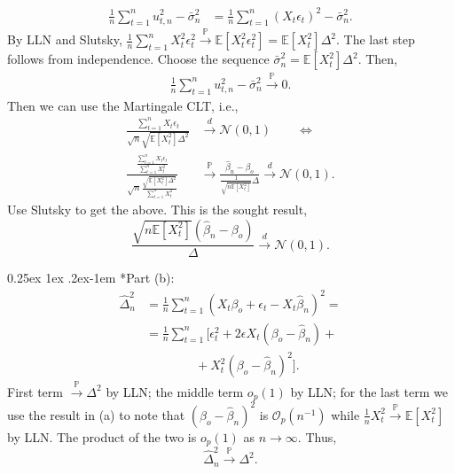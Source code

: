 \documentclass[9pt]{extarticle}
\makeatletter
\newcommand{\PP}{\mathbb{P}}
\newcommand{\EE}{\mathbb{E}}
\renewcommand{\paragraph}{%
  \@startsection{paragraph}{4}%
  {\z@}{0.25ex \@plus 1ex \@minus .2ex}{-1em}%
  {\normalfont\normalsize\bfseries}%
}
\newcommand{\darrow}{\overset{d}{\rightarrow}}
\newcommand{\parrow}{\overset{\PP}{\rightarrow}}
\makeatother
\begin{document}
\begin{multicols*}{4}
\newcommand{\bs}{\bar{\sigma}_n^2}%
\begin{align*}
    \frac{1}{n}\sum_{t=1}^n u_{t,n}^2 - \bs &= \frac{1}{n}\sum_{t=1}^n (X_t \epsilon_t)^2 - \bs.
\end{align*}
By LLN and Slutsky, $\frac{1}{n}\sum_{t=1}^n X_t^2\epsilon_t^2 \parrow \EE[X_t^2 \epsilon_t^2] = \EE[X_t^2]\Delta^2$. The last step follows from independence. Choose the sequence $\bs = \EE[X_t^2] \Delta^2$. Then,
\begin{align*}
    \frac{1}{n}\sum_{t=1}^n u_{t,n}^2 - \bs \parrow 0.
\end{align*}
Then we can use the Martingale CLT, i.e.,
\begin{align*}
    \frac{\sum_{t=1}^n X_t \epsilon_t}{\sqrt{n} \sqrt{\EE[X_t^2]\Delta^2}} &\darrow \mathcal{N}(0,1) \qquad \Leftrightarrow \\
    \frac{\frac{\sum_{t=1}^n X_t \epsilon_t}{\sum_{t=1}^n X_t^2}}{\sqrt{n} \frac{\sqrt{\EE[X_t^2]\Delta^2}}{\sum_{t=1}^n X_t^2}} &\parrow \frac{\hat{\beta}_n - \beta_o}%
    {  \frac{1}{\sqrt{n\EE[X_t^2]}}  \Delta} \darrow \mathcal{N}(0,1).
\end{align*}
Use Slutsky to get the above. This is the sought result,
\begin{equation*}
\frac{\sqrt{n\EE[X_t^2]} (\hat{\beta}_n - \beta_o)}{\Delta}\darrow \mathcal{N}(0,1).
\end{equation*}

\paragraph*{Part (b):}
\begin{align*}
    \hat{\Delta}_n^2 &= \frac{1}{n} \sum_{t=1}^n \left( X_t \beta_o + \epsilon_t - X_t \hat{\beta}_n\right)^2 = \\
    &= \frac{1}{n} \sum_{t=1}^n [ \epsilon_t^2 + 2\epsilon X_t(\beta_o - \hat{\beta}_n) + \\
    &\qquad \qquad +X_t^2 (\beta_o - \hat{\beta}_n)^2 ].
\end{align*}
First term $\parrow \Delta^2$ by LLN; the middle term $o_p(1)$ by LLN; for the last term we use the result in (a) to note that $(\beta_o - \hat{\beta}_n)^2$ is $\mathcal{O}_p(n^{-1})$ while $\frac{1}{n}X_t^2 \parrow \EE[X_t^2]$ by LLN. The product of the two is $o_p(1)$ as $n\rightarrow \infty$. Thus,
\begin{equation*}
    \hat{\Delta}_n^2 \parrow \Delta^2.
\end{equation*}


\end{multicols*}
\end{document}
